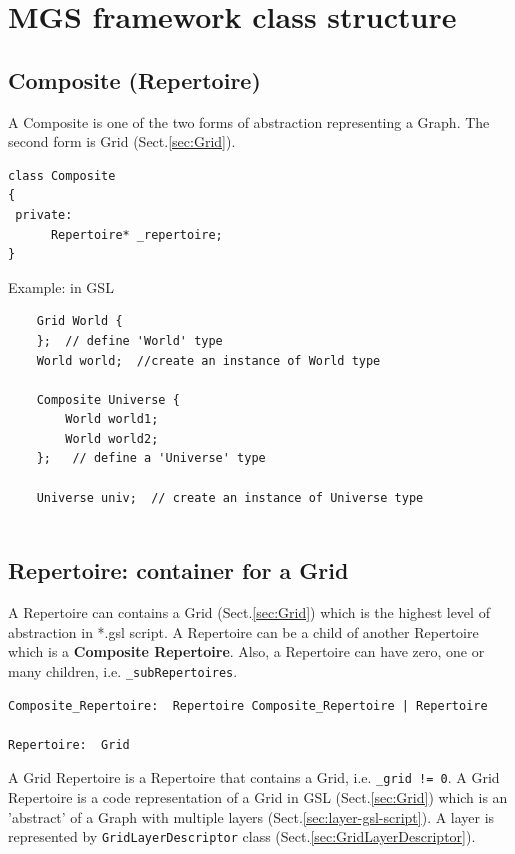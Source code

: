 \section{MGS framework class structure}

\subsection{Composite (Repertoire)}
\label{sec:Composite}


A Composite is one of the two forms of abstraction representing a Graph. The second form is Grid (Sect.\ref{sec:Grid}).

\begin{verbatim}
class Composite
{
 private:
      Repertoire* _repertoire;
}
\end{verbatim}

Example: in GSL
\begin{verbatim}
	Grid World {
	};  // define 'World' type
	World world;  //create an instance of World type
	
	Composite Universe {
		World world1;
		World world2;
	};   // define a 'Universe' type
	
	Universe univ;  // create an instance of Universe type
	
\end{verbatim}



\subsection{Repertoire: container for a Grid}
\label{sec:Repertoire}

A Repertoire can contains a Grid (Sect.\ref{sec:Grid}) which is the highest
level of abstraction in *.gsl script. A Repertoire can be a child of another
Repertoire which is a {\bf Composite Repertoire}. Also, a Repertoire can have
zero, one or many children, i.e. \verb!_subRepertoires!.

\begin{verbatim}
Composite_Repertoire:  Repertoire Composite_Repertoire | Repertoire

Repertoire:  Grid
\end{verbatim}

A Grid Repertoire is a Repertoire that contains a Grid, i.e. \verb&_grid != 0&.
A Grid Repertoire is a code representation of a Grid in GSL
(Sect.\ref{sec:Grid}) which is an 'abstract' of a Graph with multiple layers
(Sect.\ref{sec:layer-gsl-script}). A layer is represented by
\verb!GridLayerDescriptor! class (Sect.\ref{sec:GridLayerDescriptor}).


